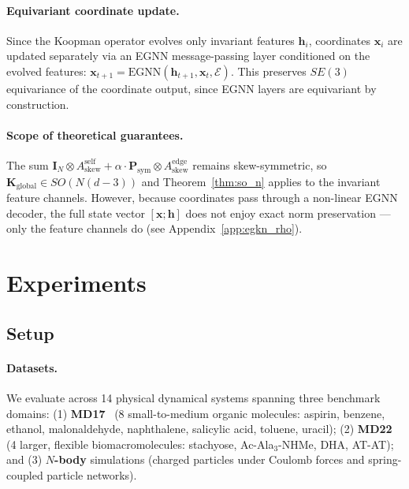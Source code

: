 \documentclass{article}
\newcommand{\K}{\mathbf{K}}
\newcommand{\x}{\mathbf{x}}
\newcommand{\Ask}{A_{\mathrm{skew}}}
\begin{document}
\paragraph{Equivariant coordinate update.}
Since the Koopman operator evolves only invariant features $\mathbf{h}_i$, coordinates $\x_i$ are updated separately via an EGNN message-passing layer conditioned on the evolved features: $\x_{t+1} = \text{EGNN}(\mathbf{h}_{t+1}, \x_t, \mathcal{E})$. This preserves $SE(3)$ equivariance of the coordinate output, since EGNN layers are equivariant by construction.

\paragraph{Scope of theoretical guarantees.}
The sum $\mathbf{I}_N \otimes \Ask^{\text{self}} + \alpha \cdot \mathbf{P}_{\text{sym}} \otimes \Ask^{\text{edge}}$ remains skew-symmetric, so $\K_{\text{global}} \in SO(N(d{-}3))$ and Theorem~\ref{thm:so_n} applies to the invariant feature channels. However, because coordinates pass through a non-linear EGNN decoder, the full state vector $[\x; \mathbf{h}]$ does not enjoy exact norm preservation --- only the feature channels do (see Appendix~\ref{app:egkn_rho}).

\section{Experiments}
\label{sec:experiments}

\subsection{Setup}

\paragraph{Datasets.}
We evaluate across 14 physical dynamical systems spanning three benchmark domains:
(1) \textbf{MD17}~\citep{chmiela2017machine} (8 small-to-medium organic molecules: aspirin, benzene, ethanol, malonaldehyde, naphthalene, salicylic acid, toluene, uracil);
(2) \textbf{MD22}~\citep{chmiela2023accurate} (4 larger, flexible biomacromolecules: stachyose, Ac-Ala$_3$-NHMe, DHA, AT-AT); and
(3) \textbf{$N$-body} simulations (charged particles under Coulomb forces and spring-coupled particle networks).
\end{document}
